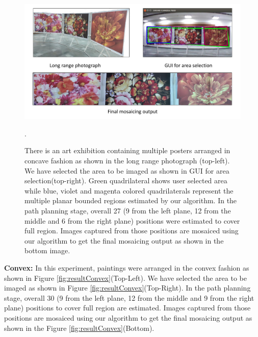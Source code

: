 \begin{figure}
\centering
\includegraphics[width=\linewidth]{figures/multiplanar/ConcaveResult.pdf}
\caption[Result: Concave arrangement]{There is an art exhibition containing
multiple posters arranged in concave fashion as shown in the long range photograph (top-left). We have
selected the area to be imaged as shown in GUI for area selection(top-right).
Green quadrilateral shows user selected area while blue, violet and magenta
colored quadrilaterals represent the multiple planar bounded regions
estimated by our algorithm. In the path planning stage, overall 27 (9 from the left
plane, 12 from the middle and 6 from the right plane) positions were estimated to cover
full region. Images captured from those positions are mosaiced using our algorithm
to get the final mosaicing output as shown in the bottom image.}
\label{fig:resultConcave}.
\end{figure}

\textbf{Convex:} In this experiment, paintings were arranged in the convex
fashion as shown in Figure \ref{fig:resultConvex}(Top-Left). We have selected
the area to be imaged as shown in Figure \ref{fig:resultConvex}(Top-Right). In
the path planning stage, overall 30 (9 from the left plane, 12 from the middle and 9
from the right plane) positions to cover full region are estimated.  Images
captured from those positions are mosaiced using our algorithm to get the final
mosaicing output as shown in the Figure \ref{fig:resultConvex}(Bottom).

